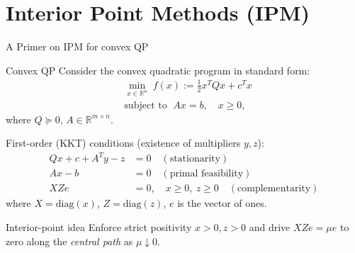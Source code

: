 \section{Interior Point Methods (IPM)}
\label{Sec:ipm}




\begin{frame}{A Primer on IPM for convex QP}
  \begin{block}{Convex QP}
Consider the convex quadratic program in standard form:
\begin{align*}
  &\min_{x\in\mathbb{R}^n} \; f(x) := \tfrac{1}{2}x^T Q x + c^T x\\
  &\text{subject to }\; A x = b, \quad x \ge 0,
\end{align*}
where $Q\succeq 0$, $A\in\mathbb{R}^{m\times n}$.

First-order (KKT) conditions (existence of multipliers $y,z$):
\begin{align*}
  Qx + c + A^T y - z &= 0 \quad (\text{stationarity})\\
  Ax - b &= 0 \quad (\text{primal feasibility})\\
  X Z e &= 0,\quad x\ge0,\ z\ge0 \quad(\text{complementarity})
\end{align*}
where $X=\mathrm{diag}(x)$, $Z=\mathrm{diag}(z)$, $e$ is the vector of ones.
\end{block}
\begin{block}{Interior-point idea}
   Enforce strict positivity $x>0, z>0$ and drive $XZe=\mu e$ to zero along the \emph{central path} as $\mu\downarrow0$.
\end{block}

\end{frame}

